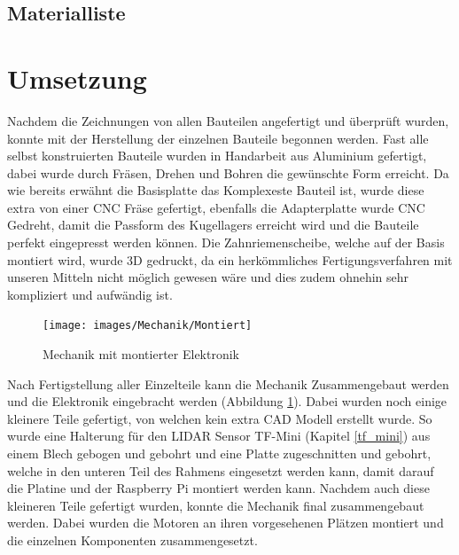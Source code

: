 \subsection{Materialliste}

\section{Umsetzung}
Nachdem die Zeichnungen von allen Bauteilen angefertigt und überprüft wurden, konnte mit der Herstellung der einzelnen Bauteile begonnen werden. Fast alle selbst konstruierten Bauteile wurden in Handarbeit aus Aluminium gefertigt, dabei wurde durch Fräsen, Drehen und Bohren die gewünschte Form erreicht. Da wie bereits erwähnt die Basisplatte das Komplexeste Bauteil ist, wurde diese extra von einer \ac{CNC} Fräse gefertigt, ebenfalls die Adapterplatte wurde \ac{CNC} Gedreht, damit die Passform des Kugellagers erreicht wird und die Bauteile perfekt eingepresst werden können. Die Zahnriemenscheibe, welche auf der Basis montiert wird, wurde \ac{3D} gedruckt, da ein herkömmliches Fertigungsverfahren mit unseren Mitteln nicht möglich gewesen wäre und dies zudem ohnehin sehr kompliziert und aufwändig ist.\\
\begin{figure}[H]
	\centering
	\texttt{[image: images/Mechanik/Montiert]}
	\caption{Mechanik mit montierter Elektronik}
	\label{montiert}
\end{figure}
Nach Fertigstellung aller Einzelteile kann die Mechanik Zusammengebaut werden und die Elektronik eingebracht werden (Abbildung \ref{montiert}). Dabei wurden noch einige kleinere Teile gefertigt, von welchen kein extra \ac{CAD} Modell erstellt wurde. So wurde eine Halterung für den \ac{LIDAR} Sensor TF-Mini (Kapitel \ref{tf_mini}) aus einem Blech gebogen und gebohrt und eine Platte zugeschnitten und gebohrt, welche in den unteren Teil des Rahmens eingesetzt werden kann, damit darauf die Platine und der Raspberry Pi montiert werden kann. Nachdem auch diese kleineren Teile gefertigt wurden, konnte die Mechanik final zusammengebaut werden. Dabei wurden die Motoren an ihren vorgesehenen Plätzen montiert und die einzelnen Komponenten zusammengesetzt.
